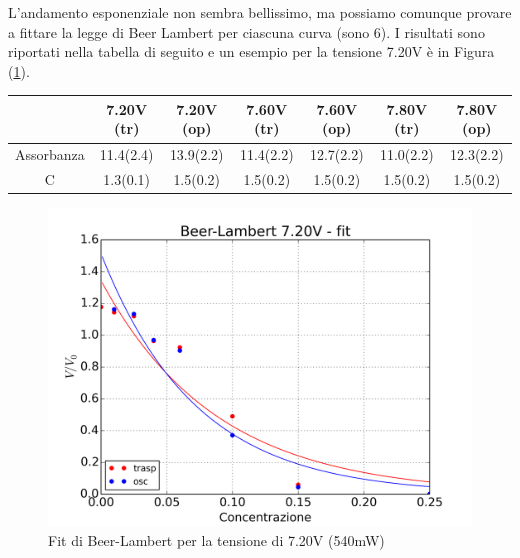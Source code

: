 \documentclass[10pt,letterpaper]{article}
\begin{document}
L'andamento esponenziale non sembra bellissimo, ma possiamo comunque provare a fittare la legge di Beer Lambert per ciascuna curva (sono 6). I risultati sono riportati nella tabella di seguito e un esempio per la tensione 7.20V è in Figura (\ref{fig:concentr_7_20_fit}).

\begin{table}[h]
\centering
\begin{tabular}{c|c|c|c|c|c|c}
  & \textbf{7.20}V (tr) & \textbf{7.20V} (op)  & \textbf{7.60V} (tr) & \textbf{7.60V} (op) & \textbf{7.80V} (tr) & \textbf{7.80V} (op)\\ 
\hline Assorbanza & 11.4(2.4) & 13.9(2.2) & 11.4(2.2) & 12.7(2.2) & 11.0(2.2) & 12.3(2.2) \\ 
 C & 1.3(0.1) & 1.5(0.2) & 1.5(0.2) & 1.5(0.2) & 1.5(0.2) & 1.5(0.2)\\ 
\hline
\end{tabular} 
\end{table}


\begin{figure}
\centering
\includegraphics[width=0.7\linewidth]{./concentr_7_20_fit}
\caption{Fit di Beer-Lambert per la tensione di 7.20V (540mW)}
\label{fig:concentr_7_20_fit}
\end{figure}
\end{document}
